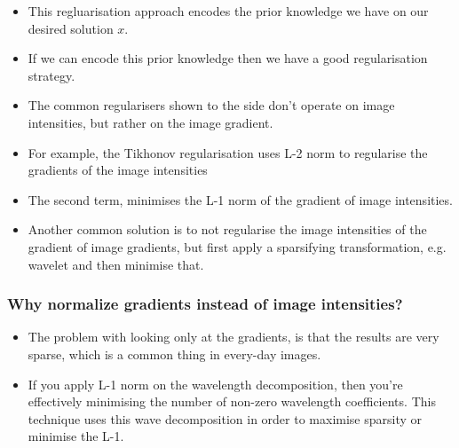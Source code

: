 \documentclass[11pt]{article}
\begin{document}
\begin{minipage}[l]{.5\linewidth}
    \begin{figure}[H]
        \centering
    \end{figure}    
\end{minipage}\hfill
\begin{minipage}[r]{.48\linewidth}
    \begin{itemize}
        \item This regluarisation approach encodes the prior knowledge we have on our desired solution $x$.
        \item If we can encode this prior knowledge then we have a good regularisation strategy.
        \item The common regularisers shown to the side don't operate on image intensities, but rather on the image gradient. 
        \item For example, the Tikhonov regularisation uses L-2 norm to regularise the gradients of the image intensities
    \end{itemize}
\end{minipage}
\begin{itemize}
    \item The second term, minimises the L-1 norm of the gradient of image intensities. 
    \item Another common solution is to not regularise the image intensities of the gradient of image gradients, but first apply a sparsifying transformation, e.g. wavelet and then minimise that.
\end{itemize}

\subsubsection{Why normalize gradients instead of image intensities?}

\begin{minipage}[l]{.5\linewidth}
    \begin{figure}[H]
        \centering
        
    \end{figure}    
\end{minipage}\hfill
\begin{minipage}[r]{.48\linewidth}
    \begin{itemize}
        \item The problem with looking only at the gradients, is that the results are very sparse, which is a common thing in every-day images. 
        \item If you apply L-1 norm on the wavelength decomposition, then you're effectively minimising the number of non-zero wavelength coefficients. This technique uses this wave decomposition in order to maximise sparsity or minimise the L-1.
    \end{itemize}    
\end{minipage}
\end{document}
